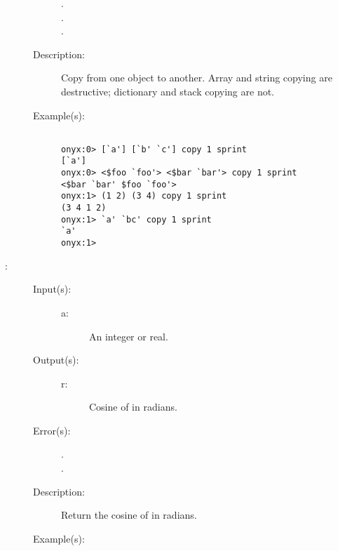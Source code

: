 \begin{description}
\begin{description}
\begin{description}
		\item[.]
		\item[.]
		\item[.]
		\end{description}
	\item[Description: ]
		Copy from one object to another.  Array and string copying are
		destructive; dictionary and stack copying are not.
	\item[Example(s): ]\begin{verbatim}

onyx:0> [`a'] [`b' `c'] copy 1 sprint
[`a']
onyx:0> <$foo `foo'> <$bar `bar'> copy 1 sprint
<$bar `bar' $foo `foo'>
onyx:1> (1 2) (3 4) copy 1 sprint
(3 4 1 2)
onyx:1> `a' `bc' copy 1 sprint
`a'
onyx:1>
		\end{verbatim}
	\end{description}
\label{systemdict:cos}
\item[{\onyxop{a}{cos}{r}}: ]
	\begin{description}\item[]
	\item[Input(s): ]
		\begin{description}\item[]
		\item[a: ]
			An integer or real.
		\end{description}
	\item[Output(s): ]
		\begin{description}\item[]
		\item[r: ]
			Cosine of  in radians.
		\end{description}
	\item[Error(s): ]
		\begin{description}\item[]
		\item[.]
		\item[.]
		\end{description}
	\item[Description: ]
		Return the cosine of  in radians.
	\item[Example(s): ]\begin{verbatim}


\end{verbatim}
\end{description}
\end{description}
